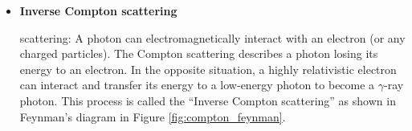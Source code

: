 
\begin{itemize}
    \item \textbf{Inverse Compton scattering}
    
    scattering: A photon can electromagnetically interact with an
    electron (or any charged particles). The Compton scattering
    describes a photon losing its energy to an electron.
    In the opposite situation, a highly relativistic electron
    can interact and transfer its energy to a low-energy photon
    to become a $\gamma$-ray photon. This process is called the
    ``Inverse Compton scattering'' as shown in Feynman's
    diagram in Figure \ref{fig:compton_feynman}.




\end{itemize}
